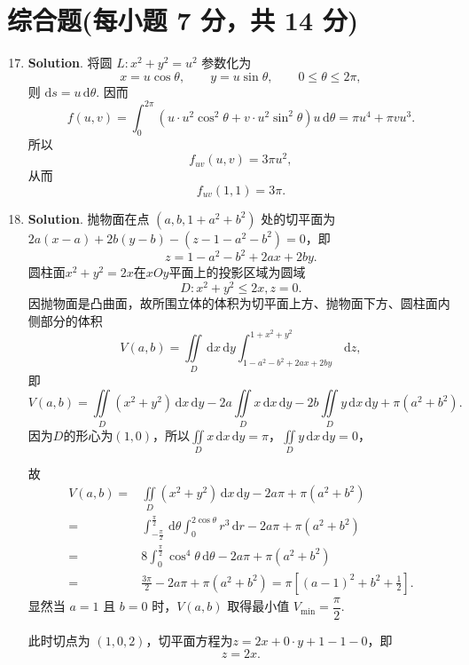 \documentclass[../main.tex]{subfiles}
\begin{document}
\section{综合题(每小题 7 分，共 14 分)}
\begin{enumerate}
  \setcounter{enumi}{16}
  \item \textbf{Solution}. 将圆 \(L:x^2+y^2=u^2\) 参数化为
        \[
          x=u\cos\theta,\qquad y=u\sin\theta,\qquad 0\le\theta\le2\pi,
        \]
        则 \(\mathrm{d}s=u\,\mathrm{d}\theta\). 因而
        \[
          f(u,v)=\int_0^{2\pi}\left(u\cdot u^2\cos^2\theta+v\cdot u^2\sin^2\theta\right)u\,\mathrm{d}\theta
          =\pi u^4+\pi vu^3.
        \]
        所以
        \[
          f_{uv}(u,v)=3\pi u^2,
        \]
        从而
        \[
          f_{uv}(1,1)=3\pi.
        \]

  \item \textbf{Solution}. 抛物面在点 \((a,b,1+a^2+b^2)\) 处的切平面为$2a(x-a)+2b(y-b)-(z-1-a^2-b^2)=0$，即
        \[
          z=1-a^2-b^2+2ax+2by.
        \]
        圆柱面$x^2+y^2=2x$在$xOy$平面上的投影区域为圆域
        \[
          D:x^2+y^2\le2x,z=0.
        \]
        因抛物面是凸曲面，故所围立体的体积为切平面上方、抛物面下方、圆柱面内侧部分的体积
        \[
          V(a,b)=\iint\limits_{D}\,\mathrm{d}x\,\mathrm{d}y\int_{1-a^2-b^2+2ax+2by}^{1+x^2+y^2}\,\mathrm{d}z,
        \]
        即
        \[
          V(a,b)=\iint\limits_{D}\left(x^2+y^2\right)\,\mathrm{d}x\,\mathrm{d}y-2a\iint\limits_{D}x\,\mathrm{d}x\,\mathrm{d}y-2b\iint\limits_{D}y\,\mathrm{d}x\,\mathrm{d}y+\pi(a^2+b^2).
        \]
        因为$D$的形心为$(1,0)$，所以$\iint\limits_{D}x\,\mathrm{d}x\,\mathrm{d}y=\pi$，$\iint\limits_{D}y\,\mathrm{d}x\,\mathrm{d}y=0$，

        故
        \[
          \begin{aligned}
            V(a,b)= {} & \iint\limits_{D}\left(x^2+y^2\right)\,\mathrm{d}x\,\mathrm{d}y-2a\pi+\pi(a^2+b^2)                               \\
            = {}       & \int_{-\frac{\pi}{2}}^{\frac{\pi}{2}}\,\mathrm{d}\theta\int_0^{2\cos\theta} r^3\,\mathrm{d}r-2a\pi+\pi(a^2+b^2) \\
            = {}       & 8\int_{0}^{\frac{\pi}{2}}\cos^4\theta\,\mathrm{d}\theta-2a\pi+\pi(a^2+b^2)                                      \\
            = {}       & \frac{3\pi}{2}-2a\pi+\pi(a^2+b^2)=\pi\left[(a-1)^2+b^2+\frac{1}{2}\right].
          \end{aligned}
        \]
        显然当 \(a=1\) 且 \(b=0\) 时，\(V(a,b)\) 取得最小值 \(V_{\min}=\dfrac{\pi}{2}\).

        此时切点为 \((1,0,2)\)，切平面方程为$z=2x+0\cdot y+1-1-0$，即
        \[
          z=2x.
        \]

\end{enumerate}
\end{document}
